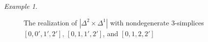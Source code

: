 \documentclass[12pt]{article}
\theoremstyle{plain}
\theoremstyle{definition}
\theoremstyle{remark}
\newtheorem{example}[theorem]{Example}
\begin{document}
\begin{example}
\begin{figure}[!htp]
\begin{center}
\end{center}
\caption{The realization of $|\Delta^2\times \Delta^1|$ with nondegenerate $3$-simplices $[0,0',1',2']$, $[0,1,1',2']$, and $[0,1,2,2']$}\label{F: fig22}
\end{figure}



\end{example}
\end{document}

